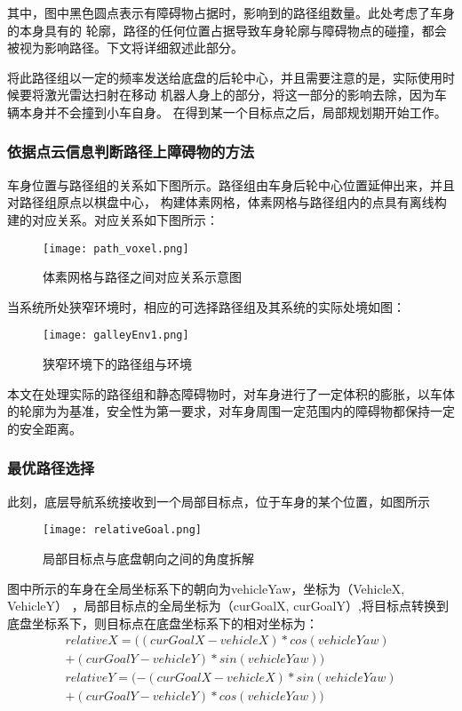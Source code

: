 其中，图中黑色圆点表示有障碍物占据时，影响到的路径组数量。此处考虑了车身的本身具有的
轮廓，路径的任何位置占据导致车身轮廓与障碍物点的碰撞，都会被视为影响路径。下文将详细叙述此部分。

将此路径组以一定的频率发送给底盘的后轮中心，并且需要注意的是，实际使用时候要将激光雷达扫射在移动
机器人身上的部分，将这一部分的影响去除，因为车辆本身并不会撞到小车自身。
在得到某一个目标点之后，局部规划期开始工作。

\subsubsection{依据点云信息判断路径上障碍物的方法}

车身位置与路径组的关系如下图所示。路径组由车身后轮中心位置延伸出来，并且对路径组原点以棋盘中心，
构建体素网格，体素网格与路径组内的点具有离线构建的对应关系。对应关系如下图所示：
\begin{figure}[ht]
    \centering
    \texttt{[image: path\_voxel.png]}
    \caption{体素网格与路径之间对应关系示意图}
\end{figure}

当系统所处狭窄环境时，相应的可选择路径组及其系统的实际处境如图：
\begin{figure}[ht]
    \centering
    \texttt{[image: galleyEnv1.png]}
    \caption{狭窄环境下的路径组与环境}
\end{figure}
本文在处理实际的路径组和静态障碍物时，对车身进行了一定体积的膨胀，以车体的轮廓为为基准，安全性为第一要求，对车身周围一定范围内的障碍物都保持一定的安全距离。



\subsubsection{最优路径选择}
此刻，底层导航系统接收到一个局部目标点，位于车身的某个位置，如图所示

\begin{figure}[ht]
    \centering
    \texttt{[image: relativeGoal.png]}
    \caption{局部目标点与底盘朝向之间的角度拆解}
\end{figure}
图中所示的车身在全局坐标系下的朝向为vehicleYaw，坐标为（VehicleX,  VehicleY）
，局部目标点的全局坐标为（curGoalX, curGoalY）,将目标点转换到底盘坐标系下，则目标点在底盘坐标系下的相对坐标为：
\begin{equation}
    \begin{aligned}
        relativeX = ((curGoalX - vehicleX) * cos(vehicleYaw) \\
        + (curGoalY - vehicleY) * sin(vehicleYaw)) \\
        relativeY = (-(curGoalX - vehicleX) * sin(vehicleYaw) \\
        + (curGoalY - vehicleY) * cos(vehicleYaw))
    \end{aligned}
\end{equation}

